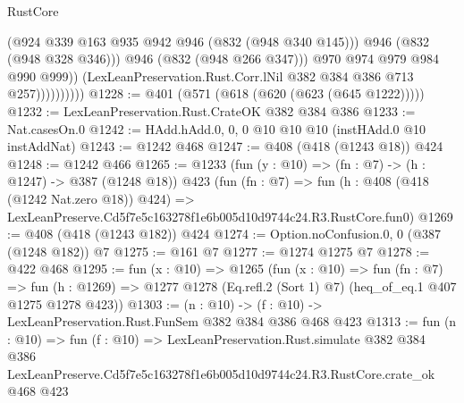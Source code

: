 \begin{lexlean}{RustCore}
\begin{coremodule}
                              (@924 @339 @163 @935 @942 @946 (@832 (@948 @340 @145)))
                              @946
                              (@832 (@948 @328 @346)))
                            @946
                            (@832 (@948 @266 @347)))
                          @970
                          @974
                          @979
                          @984
                          @990
                          @999))
                      (LexLeanPreservation.Rust.Corr.lNil @382 @384 @386 @713 @257))))))))))
@1228 := @401 (@571 (@618 (@620 (@623 (@645 @1222)))))
@1232 := LexLeanPreservation.Rust.CrateOK @382 @384 @386
@1233 := Nat.casesOn.{0}
@1242 := HAdd.hAdd.{0, 0, 0} @10 @10 @10 (instHAdd.{0} @10 instAddNat)
@1243 := @1242 @468
@1247 := @408 (@418 (@1243 @18)) @424
@1248 := @1242 @466
@1265 := @1233
    (fun (y : @10) => (fn : @7) -> (h : @1247) -> @387 (@1248 @18))
    @423
    (fun (fn : @7) =>
    fun (h : @408 (@418 (@1242 Nat.zero @18)) @424) =>
    LexLeanPreserve.Cd5f7e5c163278f1e6b005d10d9744c24.R3.RustCore.fun0)
@1269 := @408 (@418 (@1243 @182)) @424
@1274 := Option.noConfusion.{0, 0} (@387 (@1248 @182)) @7
@1275 := @161 @7
@1277 := @1274 @1275 @7
@1278 := @422 @468
@1295 := fun (x : @10) =>
  @1265
    (fun (x : @10) =>
    fun (fn : @7) =>
    fun (h : @1269) => @1277 @1278 (Eq.refl.{2} (Sort 1) @7) (heq_of_eq.{1} @407 @1275 @1278 @423))
@1303 := (n : @10) -> (f : @10) -> LexLeanPreservation.Rust.FunSem @382 @384 @386 @468 @423
@1313 := fun (n : @10) =>
  fun (f : @10) =>
  LexLeanPreservation.Rust.simulate
    @382
    @384
    @386
    LexLeanPreserve.Cd5f7e5c163278f1e6b005d10d9744c24.R3.RustCore.crate_ok
    @468
    @423
\end{coremodule}
\end{lexlean}
